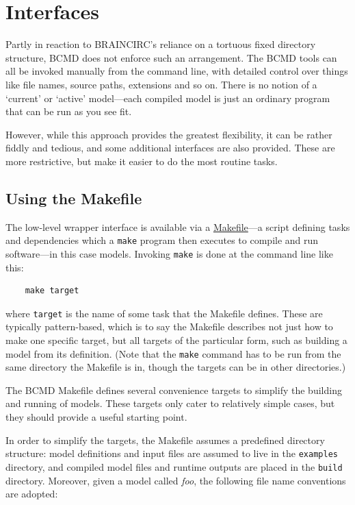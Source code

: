 \documentclass[a4paper,11pt]{article}
\begin{document}
\section{Interfaces}

Partly in reaction to BRAINCIRC's reliance on a tortuous fixed directory structure, BCMD does not enforce such an arrangement. The BCMD tools can all be invoked manually from the command line, with detailed control over things like file names, source paths, extensions and so on. There is no notion of a `current' or `active' model---each compiled model is just an ordinary program that can be run as you see fit.

However, while this approach provides the greatest flexibility, it can be rather fiddly and tedious, and some additional interfaces are also provided. These are more restrictive, but make it easier to do the most routine tasks.


\subsection{Using the Makefile}\label{makefile}

The low-level wrapper interface is available via a \href{http://en.wikipedia.org/wiki/Make_(software)}{Makefile}---a script defining tasks and dependencies which a \texttt{make} program then executes to compile and run software---in this case models. Invoking \texttt{make} is done at the command line like this:
\begin{verbatim}
    make target
\end{verbatim}
where \texttt{target} is the name of some task that the Makefile defines. These are typically pattern-based, which is to say the Makefile describes not just how to make one specific target, but all targets of the particular form, such as building a model from its definition. (Note that the \texttt{make} command has to be run from the same directory the Makefile is in, though the targets can be in other directories.)

The BCMD Makefile defines several convenience targets to simplify the building and running of models. These targets only cater to relatively simple cases, but they should provide a useful starting point.

In order to simplify the targets, the Makefile assumes a predefined directory structure: model definitions and input files are assumed to live in the \texttt{examples} directory, and compiled model files and runtime outputs are placed in the \texttt{build} directory. Moreover, given a model called \textit{foo}, the following file name conventions are adopted:
\end{document}
